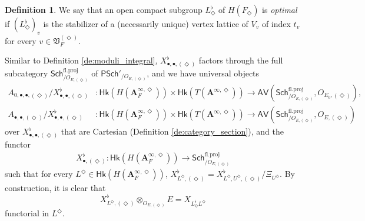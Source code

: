 \documentclass[12pt]{amsart}
\numberwithin{equation}{section}
\theoremstyle{plain}
\theoremstyle{definition}
\newtheorem{definition}[proposition]{Definition}
\theoremstyle{remark}
\renewcommand{\b}[1]{\mathbf{#1}}
\newcommand{\f}[1]{\mathfrak{#1}}
\renewcommand{\r}[1]{\mathrm{#1}}
\renewcommand{\sf}[1]{\mathsf{#1}}
\renewcommand{\(}{\left(}
\renewcommand{\)}{\right)}
\newcommand{\bA}{\b A}
\newcommand{\fV}{\f V}
\newcommand{\sfP}{\sf P}
\newcommand{\proj}{\r{fl.proj}}
\newcommand{\Sch}{\sf{Sch}}
\newcommand{\AV}{\sf{AV}}
\newcommand{\Hk}{\sf{Hk}}
\begin{document}
\begin{definition}\label{de:principal_level}
We say that an open compact subgroup $L^\flat_\Diamond$ of $H(F_\Diamond)$ is \emph{optimal} if $(L^\flat_\Diamond)_v$ is the stabilizer of a (necessarily unique) vertex lattice of $V_v$ of index $t_v$ for every $v\in\fV_F^{(\Diamond)}$.
\end{definition}



Similar to Definition \ref{de:moduli_integral}, $X^\flat_{\bullet,\bullet,(\Diamond)}$ factors through the full subcategory $\Sch^\proj_{/O_{E,(\Diamond)}}$ of $\sfP\Sch'_{/O_{E,(\Diamond)}}$, and we have universal objects
\begin{align*}
A_{0,\bullet,\bullet,(\Diamond)}/X^\flat_{\bullet,\bullet,(\Diamond)}&\colon
\Hk(H(\bA_F^{\infty,\Diamond}))\times\Hk(T(\bA^{\infty,\Diamond}))
\to\AV(\Sch^\proj_{/O_{E,(\Diamond)}},O_{E_0,(\Diamond)}),\\
A_{\bullet,\bullet,(\Diamond)}/X^\flat_{\bullet,\bullet,(\Diamond)}&\colon
\Hk(H(\bA_F^{\infty,\Diamond}))\times\Hk(T(\bA^{\infty,\Diamond}))
\to\AV(\Sch^\proj_{/O_{E,(\Diamond)}},O_{E,(\Diamond)})
\end{align*}
over $X^\flat_{\bullet,\bullet,(\Diamond)}$ that are Cartesian (Definition \ref{de:category_section}), and the functor
\begin{align*}
X^\flat_{\bullet,(\Diamond)}\colon\Hk(H(\bA_F^{\infty,\Diamond}))\to\Sch^\proj_{/O_{E,(\Diamond)}}
\end{align*}
such that for every $L^\Diamond\in\Hk(H(\bA_F^{\infty,\Diamond}))$, $X^\flat_{L^\Diamond,(\Diamond)}=X^\flat_{L^\Diamond,U^\Diamond,(\Diamond)}/\Xi_{U^\Diamond}$. By construction, it is clear that
\[
X^\flat_{L^\Diamond,(\Diamond)}\otimes_{O_{E,(\Diamond)}}E=X_{L^\flat_\Diamond L^\Diamond}
\]
functorial in $L^\Diamond$.
\end{document}
